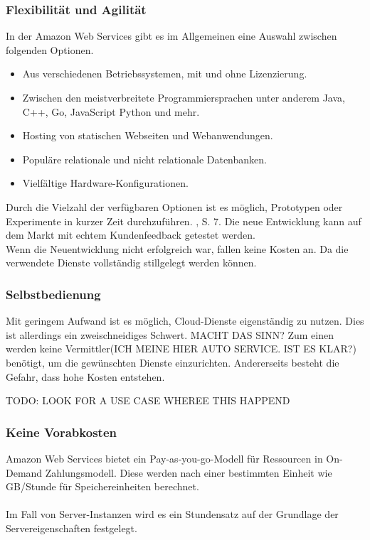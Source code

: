 \subsubsection{Flexibilität und Agilität}
In der Amazon Web Services gibt es im Allgemeinen eine Auswahl zwischen folgenden Optionen.
\begin{itemize}
      \item
            Aus verschiedenen Betriebssystemen, mit und ohne Lizenzierung.
      \item
            Zwischen den meistverbreitete Programmiersprachen unter anderem Java, C++, Go, JavaScript Python und mehr.
      \item
            Hosting von statischen Webseiten und Webanwendungen.
      \item
            Populäre relationale und nicht relationale Datenbanken.
      \item
            Vielfältige Hardware-Konfigurationen.

\end{itemize}
\begin{flushleft}
      Durch die Vielzahl der verfügbaren Optionen ist es möglich, Prototypen oder Experimente in kurzer Zeit durchzuführen.
      {\cite{IDC01}}, S. 7.
      Die neue Entwicklung kann auf dem Markt mit echtem Kundenfeedback getestet werden.
      \\
      Wenn die Neuentwicklung nicht erfolgreich war, fallen keine Kosten an.
      Da die verwendete Dienste vollständig stillgelegt werden können.
\end{flushleft}
{\cite{AMZ03, AMZ04}}

\subsubsection{Selbstbedienung}
Mit geringem Aufwand ist es möglich, Cloud-Dienste eigenständig zu nutzen. Dies ist allerdings ein zweischneidiges Schwert.
MACHT DAS SINN?
Zum einen werden keine Vermittler(ICH MEINE HIER AUTO SERVICE. IST ES KLAR?) benötigt, um die gewünschten Dienste einzurichten. Andererseits besteht die Gefahr, dass hohe Kosten entstehen.

TODO: LOOK FOR A USE CASE WHEREE THIS HAPPEND

\subsubsection{Keine Vorabkosten}
Amazon Web Services bietet ein Pay-as-you-go-Modell für Ressourcen in On-Demand Zahlungsmodell.
Diese werden nach einer bestimmten Einheit wie GB/Stunde für Speichereinheiten berechnet.
\\\\
Im Fall von Server-Instanzen wird es ein Stundensatz auf der Grundlage \newline der Servereigenschaften festgelegt.


